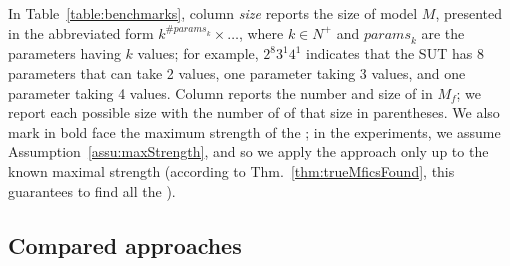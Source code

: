 \begin{tikzborder}{\cite{Gargantini16:validation}}
\begin{tikzborder}{\cite{gargantini_combinatorial_2017}}
\begin{tikzborder}{\cite{garn2019}}
\begin{tikzborder}{\cite{arcaini2019achieving}}
\begin{tikzborder}{}
In Table~\ref{table:benchmarks}, column \textit{size} reports the size of model $M$, presented in the abbreviated form $k^{\# \mathit{params}_k} \times \ldots$, where $k$$\in$$N^+$ and $\mathit{params}_k$ are the parameters having $k$ values; for example, $2^8$$3^1$$4^1$ indicates that the SUT has 8 parameters that can take 2 values, one parameter taking 3 values, and one parameter taking 4 values. Column \trueMficsSet reports the number and size of \truemfics in $M_f$; we report each possible size with the number of \mfics of that size in parentheses. We also mark in bold face the maximum strength of the \truemfic; in the experiments, we assume Assumption~\ref{assu:maxStrength}, and so we apply the approach only up to the known maximal strength (according to Thm.~\ref{thm:trueMficsFound}, this guarantees to find all the \mfics).
\end{tikzborder}

\subsection{Compared approaches}\label{sec:processes}


\end{tikzborder}
\end{tikzborder}
\end{tikzborder}
\end{tikzborder}
